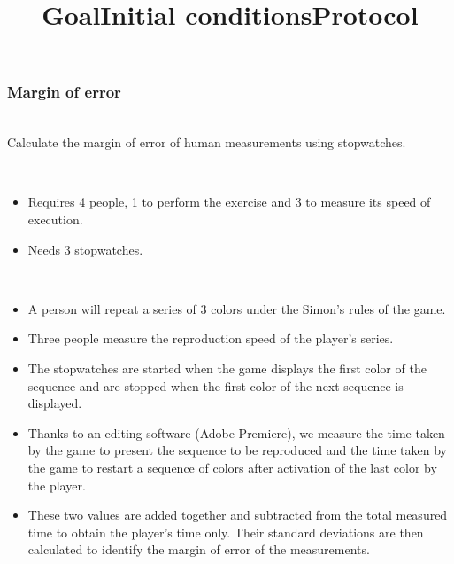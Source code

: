 \documentclass[12pt, openany, twocolumn]{article}
\begin{document}
        \subsubsection{Margin of error}
            \title{\textbf{Goal}} \\
                Calculate the margin of error of human measurements using stopwatches. \\
            \title{\textbf{Initial conditions}} \\
                \begin{itemize}
                    \item{Requires 4 people, 1 to perform the exercise and 3 to measure its speed of execution.} \\
                    \item{Needs 3 stopwatches.} \\
                \end{itemize}
            \title{\textbf{Protocol}} \\
                \begin{itemize}
                    \item{A person will repeat a series of 3 colors under the Simon's rules of the game.} \\
                    \item{Three people measure the reproduction speed of the player's series.} \\
                    \item{The stopwatches are started when the game displays the first color of the sequence and are stopped when the first color of the next sequence is displayed.} \\
                    \item{Thanks to an editing software (Adobe Premiere), we measure the time taken by the game to present the sequence to be reproduced and the time taken by the game to restart a sequence of colors after activation of the last color by the player.} \\
                    \item{These two values are added together and subtracted from the total measured time to obtain the player's time only. Their standard deviations are then calculated to identify the margin of error of the measurements.} \\
                \end{itemize}
                
\end{document}
